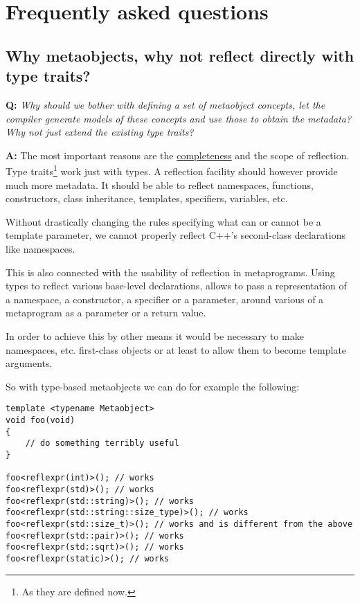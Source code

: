 \section{Frequently asked questions}

\subsection{Why metaobjects, why not reflect directly with type traits?}
\label{faq-why-metaobjects}

\textbf{Q:} {\em Why should we bother with defining a set of metaobject concepts,
let the compiler generate models of these concepts and use those to obtain
the metadata? Why not just extend the existing type traits?}

\textbf{A:} The most important reasons are the \hyperref[design-completeness]{completeness} and the scope of reflection.
Type traits\footnote{As they are defined now.} work just with types.
A reflection facility should however provide much more metadata.
It should be able to reflect namespaces, functions, constructors,
class inheritance, templates, specifiers, variables, etc.

Without drastically changing the rules specifying what can or cannot be a template
parameter, we cannot properly reflect C++'s second-class declarations like
namespaces.

This is also connected with the usability of reflection in metaprograms.
Using types to reflect various base-level declarations, allows to
pass a representation of a namespace, a constructor, a specifier or a parameter,
around various  of a metaprogram as a parameter or a return value.

In order to achieve this by other means it would be necessary to make namespaces,
etc. first-class objects or at least to allow them to become template arguments.

So with type-based metaobjects we can do for example the following:

\begin{verbatim}
template <typename Metaobject>
void foo(void)
{
	// do something terribly useful
}

foo<reflexpr(int)>(); // works
foo<reflexpr(std)>(); // works
foo<reflexpr(std::string)>(); // works
foo<reflexpr(std::string::size_type)>(); // works
foo<reflexpr(std::size_t)>(); // works and is different from the above
foo<reflexpr(std::pair)>(); // works
foo<reflexpr(std::sqrt)>(); // works
foo<reflexpr(static)>(); // works
\end{verbatim}

